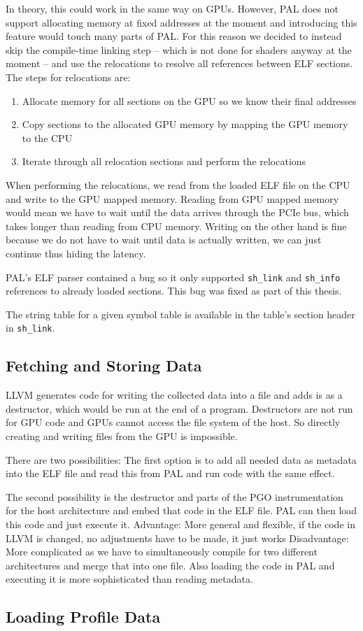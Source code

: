 In theory, this could work in the same way on GPUs. However, PAL does not support allocating memory at fixed addresses at the moment and introducing this feature would touch many parts of PAL. For this reason we decided to instead skip the compile-time linking step -- which is not done for shaders anyway at the moment -- and use the relocations to resolve all references between ELF sections.
The steps for relocations are:
\begin{enumerate}
	\item Allocate memory for all sections on the GPU so we know their final addresses
	\item Copy sections to the allocated GPU memory by mapping the GPU memory to the CPU
	\item Iterate through all relocation sections and perform the relocations
\end{enumerate}
When performing the relocations, we read from the loaded ELF file on the CPU and write to the GPU mapped memory. Reading from GPU mapped memory would mean we have to wait until the data arrives through the PCIe bus, which takes longer than reading from CPU memory. Writing on the other hand is fine because we do not have to wait until data is actually written, we can just continue thus hiding the latency.

PAL's ELF parser contained a bug so it only supported \texttt{sh\_link} and \texttt{sh\_info} references to already loaded sections. This bug was fixed as part of this thesis.

The string table for a given symbol table is available in the table's section header in \texttt{sh\_link}.

\subsection{Fetching and Storing Data}
\label{sub:save}
LLVM generates code for writing the collected data into a file and adds is as a destructor, which would be run at the end of a program. Destructors are not run for GPU code and GPUs cannot access the file system of the host. So directly creating and writing files from the GPU is impossible.

There are two possibilities: The first option is to add all needed data as metadata into the ELF file and read this from PAL and run code with the same effect.

The second possibility is the destructor and parts of the PGO instrumentation for the host architecture and embed that code in the ELF file. PAL can then load this code and just execute it.
Advantage: More general and flexible, if the code in LLVM is changed, no adjustments have to be made, it just works
Disadvantage: More complicated as we have to simultaneously compile for two different architectures and merge that into one file. Also loading the code in PAL and executing it is more sophisticated than reading metadata.

\subsection{Loading Profile Data}
\label{sub:load}